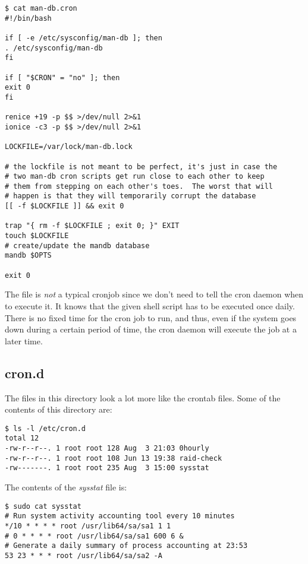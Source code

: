 \vspace{-15pt}
\begin{verbatim}
$ cat man-db.cron 
#!/bin/bash

if [ -e /etc/sysconfig/man-db ]; then
. /etc/sysconfig/man-db
fi

if [ "$CRON" = "no" ]; then
exit 0
fi

renice +19 -p $$ >/dev/null 2>&1
ionice -c3 -p $$ >/dev/null 2>&1

LOCKFILE=/var/lock/man-db.lock

# the lockfile is not meant to be perfect, it's just in case the
# two man-db cron scripts get run close to each other to keep
# them from stepping on each other's toes.  The worst that will
# happen is that they will temporarily corrupt the database
[[ -f $LOCKFILE ]] && exit 0

trap "{ rm -f $LOCKFILE ; exit 0; }" EXIT
touch $LOCKFILE
# create/update the mandb database
mandb $OPTS

exit 0
\end{verbatim}
\vspace{-10pt}

The file is \textit{not} a typical cronjob since we don't need to tell the cron daemon when to execute it. It knows that the given shell script has to be executed once daily. There is no fixed time for the cron job to run, and thus, even if the system goes down during a certain period of time, the cron daemon will execute the job at a later time. 

\subsection{cron.d}
The files in this directory look a lot more like the crontab files. Some of the contents of this directory are:

\vspace{-15pt}
\begin{verbatim}
$ ls -l /etc/cron.d
total 12
-rw-r--r--. 1 root root 128 Aug  3 21:03 0hourly
-rw-r--r--. 1 root root 108 Jun 13 19:38 raid-check
-rw-------. 1 root root 235 Aug  3 15:00 sysstat
\end{verbatim}
\vspace{-10pt}

\noindent	
The contents of the \textit{sysstat} file is:

\vspace{-15pt}
\begin{verbatim}
$ sudo cat sysstat
# Run system activity accounting tool every 10 minutes
*/10 * * * * root /usr/lib64/sa/sa1 1 1
# 0 * * * * root /usr/lib64/sa/sa1 600 6 &
# Generate a daily summary of process accounting at 23:53
53 23 * * * root /usr/lib64/sa/sa2 -A
\end{verbatim}
\vspace{-10pt}

